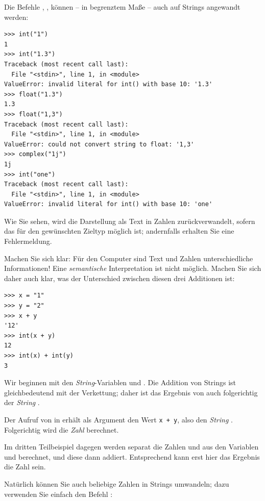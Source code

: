Die Befehle , ,  können -- in begrenztem Maße -- auch auf Strings angewandt werden:

\begin{cmdbox}
\begin{verbatim}
>>> int("1")
1
>>> int("1.3")
Traceback (most recent call last):
  File "<stdin>", line 1, in <module>
ValueError: invalid literal for int() with base 10: '1.3'
>>> float("1.3")
1.3
>>> float("1,3")
Traceback (most recent call last):
  File "<stdin>", line 1, in <module>
ValueError: could not convert string to float: '1,3'
>>> complex("1j")
1j
>>> int("one")
Traceback (most recent call last):
  File "<stdin>", line 1, in <module>
ValueError: invalid literal for int() with base 10: 'one'
\end{verbatim}
\end{cmdbox}

Wie Sie sehen, wird die Darstellung als Text in Zahlen zurückverwandelt, sofern das für den gewünschten Zieltyp möglich ist; andernfalls erhalten Sie eine Fehlermeldung.

Machen Sie sich klar: Für den Computer sind Text und Zahlen unterschiedliche Informationen! Eine \emph{semantische} Interpretation ist nicht möglich. Machen Sie sich daher auch klar, was der Unterschied zwischen diesen drei Additionen ist:
\begin{cmdbox}
\begin{verbatim}
>>> x = "1"
>>> y = "2"
>>> x + y
'12'
>>> int(x + y)
12
>>> int(x) + int(y)
3
\end{verbatim}
\end{cmdbox}

Wir beginnen mit den \emph{String}-Variablen  und . Die Addition von Strings ist gleichbedeutend mit der Verkettung; daher ist das Ergebnis von  auch folgerichtig der \emph{String} .

Der Aufruf von  in  erhält als Argument den Wert \texttt{x + y}, also den \emph{String} . Folgerichtig wird die \emph{Zahl}  berechnet.

Im dritten Teilbeispiel  dagegen werden separat die Zahlen  und  aus den Variablen  und  berechnet, und diese dann addiert. Entsprechend kann erst hier das Ergebnis die Zahl  sein.

Natürlich können Sie auch beliebige Zahlen in Strings umwandeln; dazu verwenden Sie einfach den Befehl :

